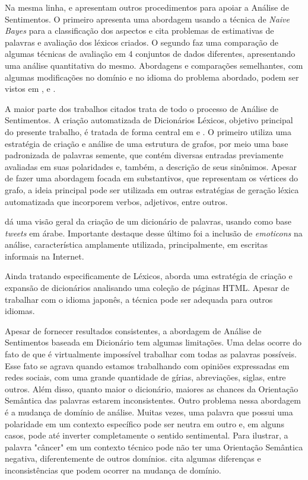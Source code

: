 \documentclass[a4paper,11pt]{article}
\begin{document}
Na mesma linha, \cite{eisenstein2016unsupervised} e \cite{bandhakavi2016lexicon} apresentam outros procedimentos para apoiar a Análise de Sentimentos. O primeiro apresenta uma abordagem usando a técnica de \emph{Naive Bayes} para a classificação dos aspectos e cita problemas de estimativas de palavras e avaliação dos léxicos criados. O segundo faz uma comparação de algumas técnicas de avaliação em 4 conjuntos de dados diferentes, apresentando uma análise quantitativa do mesmo. Abordagens e comparações semelhantes, com algumas modificações no domínio e no idioma do problema abordado, podem ser vistos em \cite{khoo2017lexicon}, \cite{asghar2014review} e \cite{ding2008holistic}.

A maior parte dos trabalhos citados trata de todo o processo de Análise de Sentimentos. A criação automatizada de Dicionários Léxicos, objetivo principal do presente trabalho, é tratada de forma central em \cite{widdows2002graph} e \cite{duwairi2015detecting}. O primeiro utiliza uma estratégia de criação e análise de uma estrutura de grafos, por meio uma base padronizada de palavras semente, que contém diversas entradas previamente avaliadas em suas polaridades e, também, a descrição de seus sinônimos. Apesar de fazer uma abordagem focada em substantivos, que representam os vértices do grafo, a ideia principal pode ser utilizada em outras estratégias de geração léxica automatizada que incorporem verbos, adjetivos, entre outros. 

\cite{duwairi2015detecting} dá uma visão geral da criação de um dicionário de palavras, usando como base \emph{tweets} em árabe. Importante destaque desse último foi a inclusão de \emph{emoticons} na análise, característica amplamente utilizada, principalmente, em escritas informais na Internet.

Ainda tratando especificamente de Léxicos, \cite{kaji} aborda uma estratégia de criação e expansão de dicionários analisando uma coleção de páginas HTML. Apesar de trabalhar com o idioma japonês, a técnica pode ser adequada para outros idiomas.

Apesar de fornecer resultados consistentes, a abordagem de Análise de Sentimentos baseada em Dicionário tem algumas limitações. Uma delas ocorre do fato de que é virtualmente impossível trabalhar com todas as palavras possíveis. Esse fato se agrava quando estamos trabalhando com opiniões expressadas em redes sociais, com uma grande quantidade de gírias, abreviações, siglas, entre outros. Além disso, quanto maior o dicionário, maiores as chances da Orientação Semântica das palavras estarem inconsistentes. Outro problema nessa abordagem é a mudança de domínio de análise. Muitas vezes, uma palavra que possui uma polaridade em um contexto específico pode ser neutra em outro e, em alguns casos, pode até inverter completamente o sentido sentimental. Para ilustrar, a palavra "câncer" em um contexto técnico pode não ter uma Orientação Semântica negativa, diferentemente de outros domínios. \cite{kdir16} cita algumas diferenças e inconsistências que podem ocorrer na mudança de domínio.
\end{document}

